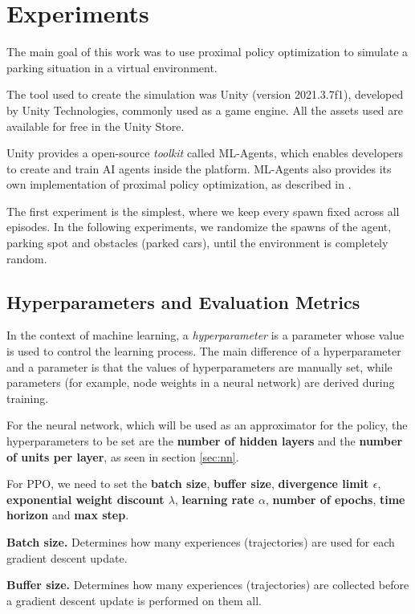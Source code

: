 \chapter{Experiments}
The main goal of this work was to use proximal policy optimization to simulate a parking situation in a virtual environment.

The tool used to create the simulation was Unity (version 2021.3.7f1), developed by Unity Technologies, commonly used as a game engine. All the assets used are available for free in the Unity Store.

Unity provides a open-source \textit{toolkit} called ML-Agents, which enables developers to create and train AI agents inside the platform. ML-Agents also provides its own implementation of proximal policy optimization, as described in \cite{schulman2017proximal}.

The first experiment is the simplest, where we keep every spawn fixed across all episodes. In the following experiments, we randomize the spawns of the agent, parking spot and obstacles (parked cars), until the environment is completely random.

\section{Hyperparameters and Evaluation Metrics}
In the context of machine learning, a \textit{hyperparameter} is a parameter whose value is used to control the learning process. The main difference of a hyperparameter and a parameter is that the values of hyperparameters are manually set, while parameters (for example, node weights in a neural network) are derived during training.

For the neural network, which will be used as an approximator for the policy, the hyperparameters to be set are the \textbf{number of hidden layers} and the \textbf{number of units per layer}, as seen in section \ref{sec:nn}.

For PPO, we need to set the \textbf{batch size}, \textbf{buffer size}, \textbf{divergence limit $\epsilon$}, \textbf{exponential weight discount $\lambda$}, \textbf{learning rate $\alpha$}, \textbf{number of epochs}, \textbf{time horizon} and \textbf{max step}.

\textbf{Batch size.} Determines how many experiences (trajectories) are used for each gradient descent update.

\textbf{Buffer size.} Determines how many experiences (trajectories) are collected before a gradient descent update is performed on them all.

